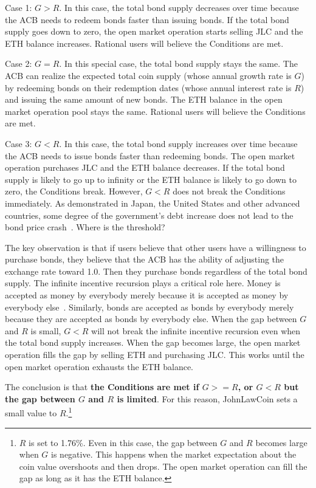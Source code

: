 \documentclass[dvipdfmx,a4paper]{article}
\begin{document}
Case 1: $G>R$. In this case, the total bond supply decreases over time because the ACB needs to redeem bonds faster than issuing bonds. If the total bond supply goes down to zero, the open market operation starts selling JLC and the ETH balance increases. Rational users will believe the Conditions are met.

Case 2: $G=R$. In this special case, the total bond supply stays the same. The ACB can realize the expected total coin supply (whose annual growth rate is $G$) by redeeming bonds on their redemption dates (whose annual interest rate is $R$) and issuing the same amount of new bonds. The ETH balance in the open market operation pool stays the same. Rational users will believe the Conditions are met.

Case 3: $G<R$. In this case, the total bond supply increases over time because the ACB needs to issue bonds faster than redeeming bonds. The open market operation purchases JLC and the ETH balance decreases. If the total bond supply is likely to go up to infinity or the ETH balance is likely to go down to zero, the Conditions break. However, $G<R$ does not break the Conditions immediately. As demonstrated in Japan, the United States and other advanced countries, some degree of the government's debt increase does not lead to the bond price crash~\cite{elmendorf1999government}. Where is the threshold?

The key observation is that if users believe that other users have a willingness to purchase bonds, they believe that the ACB has the ability of adjusting the exchange rate toward 1.0. Then they purchase bonds regardless of the total bond supply. The infinite incentive recursion plays a critical role here. Money is accepted as money by everybody merely because it is accepted as money by everybody else~\cite{iwai1996boostrap,iwai1997evolution}. Similarly, bonds are accepted as bonds by everybody merely because they are accepted as bonds by everybody else. When the gap between $G$ and $R$ is small, $G<R$ will not break the infinite incentive recursion even when the total bond supply increases. When the gap becomes large, the open market operation fills the gap by selling ETH and purchasing JLC. This works until the open market operation exhausts the ETH balance.

The conclusion is that \textbf{the Conditions are met if $G>=R$, or $G<R$ but the gap between $G$ and $R$ is limited}. For this reason, JohnLawCoin sets a small value to $R$.\footnote{$R$ is set to 1.76\%. Even in this case, the gap between $G$ and $R$ becomes large when $G$ is negative. This happens when the market expectation about the coin value overshoots and then drops. The open market operation can fill the gap as long as it has the ETH balance.}
\end{document}
